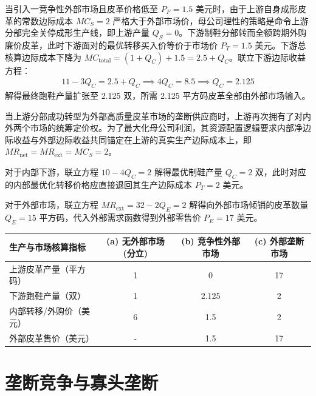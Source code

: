\begin{enumerate}[label=\textbf{\arabic*.}, leftmargin=*]
		当引入一竞争性外部市场且皮革价格低至 $P_F = 1.5$ 美元时，由于上游自身成形皮革的常数边际成本 $MC_S = 2$ 严格大于外部市场价，母公司理性的策略是命令上游分部完全关停成形生产线，即上游产量 $Q_S = 0$。下游制鞋分部转而全额跨期外购廉价皮革，此时下游面对的最优转移买入价等价于市场价 $P_T = 1.5$ 美元。下游总核算边际成本下降为 $MC_{\text{total}} = (1 + Q_C) + 1.5 = 2.5 + Q_C$。联立下游边际收益方程：
		\[
		\begin{aligned}
			11 - 3Q_C = 2.5 + Q_C \implies 4Q_C = 8.5 \implies Q_C = 2.125
		\end{aligned}
		\]
		解得最终跑鞋产量扩张至 2.125 双，所需 2.125 平方码皮革全部由外部市场输入。
		
		当上游分部成功转型为外部高质量皮革市场的垄断供应商时，上游再次拥有了对内外两个市场的统筹定价权。为了最大化母公司利润，其资源配置逻辑要求内部净边际收益与外部边际收益共同锚定在上游的真实生产边际成本上，即 $MR_{\text{net}} = MR_{\text{ext}} = MC_S = 2$。
		
		对于内部下游，联立方程 $10 - 4Q_C = 2$ 解得最优制鞋产量 $Q_C = 2$ 双，此时对应的内部最优化转移价格应直接退回其生产边际成本 $P_T = 2$ 美元。
		
		对于外部市场，联立方程 $MR_{\text{ext}} = 32 - 2Q_E = 2$ 解得向外部市场倾销的皮革数量 $Q_E = 15$ 平方码，代入外部需求函数得到外部零售价 $P_E = 17$ 美元。
		
		\begin{center}
			\small
			\renewcommand{\arraystretch}{1.3}
			\setlength{\tabcolsep}{4pt}
			\begin{tabular}{|l|c|c|c|}
				\hline
				\textbf{生产与市场核算指标} & \textbf{(a) 无外部市场(分立)} & \textbf{(b) 竞争性外部市场} & \textbf{(c) 外部垄断市场} \\
				\hline
				上游皮革产量（平方码） & 1 & 0 & 17 \\
				下游跑鞋产量（双） & 1 & 2.125 & 2 \\
				内部转移/外购价（美元） & 6 & 1.5 & 2 \\
				外部皮革售价（美元） & - & 1.5 & 17 \\
				\hline
			\end{tabular}
		\end{center}
	\end{enumerate}
	\chapter{垄断竞争与寡头垄断}
	
